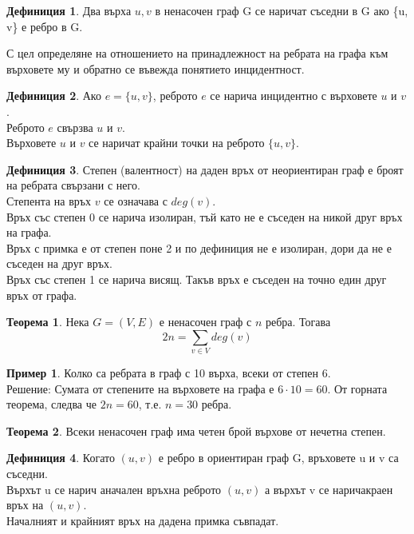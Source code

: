 \documentclass[fleqn, 12pt]{article}
\theoremstyle{definition}
\newtheorem{example}{Пример}[subsection]
\newtheorem{definition}{Дефиниция}[subsection]
\newtheorem{theorem}{Теорема}[subsection]
\begin{document}
\begin{definition}
Два върха $u, v$ в ненасочен граф G се наричат съседни в G ако \{u, v\} е ребро в G.
\end{definition}
С цел определяне на отношението на принадлежност на ребрата на графа към върховете му и обратно се въвежда понятието инцидентност.
\begin{definition}
Ако $e = \{u, v\}$, реброто $e$ се нарича инцидентно с върховете $u$ и $v$. \\
Реброто $e$ свързва $u$ и $v$.\\
Върховете $u$ и $v$ се наричат крайни точки на реброто $\{u, v\}$.
\end{definition}

\begin{definition}
Степен (валентност) на даден връх от неориентиран граф е броят на ребрата свързани с него.\\
Степента на връх $v$ се означава с $deg(v)$.\\
Връх със степен 0 се нарича изолиран, тъй като не е съседен на никой друг връх на графа. \\
Връх с примка е от степен поне 2 и по дефиниция не е изолиран, дори да не е съседен на друг връх.\\
Връх със степен 1 се нарича висящ. Такъв връх е съседен на точно един друг връх от графа.
\end{definition}

\begin{theorem}
Нека $G = (V, E)$ е ненасочен граф с $n$ ребра. Тогава
$$2n = \sum_{v\in V} deg(v)$$
\end{theorem}

\begin{example}
Колко са ребрата в граф с 10 върха, всеки от степен 6.\\
Решение: Сумата от степените на върховете на графа е $6 \cdot 10 = 60$. От горната теорема, следва че $2n = 60$, т.е. $n=30$ ребра.
\end{example}

\begin{theorem}
Всеки ненасочен граф има четен брой върхове от нечетна степен. 
\end{theorem}

\begin{definition}
Когато $(u, v)$ е ребро в ориентиран граф G, връховете u и v са съседни. \\
Върхът u се нарич аначален връхна реброто $(u, v)$ а върхът v се наричакраен връх на $(u, v)$.\\
Началният и крайният връх на дадена примка съвпадат. 
\end{definition}
\end{document}
